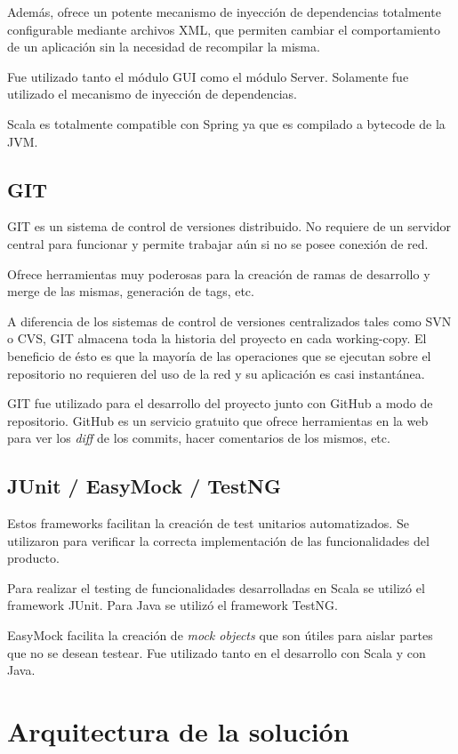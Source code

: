 \documentclass[12pt,a4paper]{article}
\let\stdsection\section
\renewcommand\section{\newpage\stdsection}
\begin{document}
Además, ofrece un potente mecanismo de inyección de dependencias totalmente configurable mediante archivos XML, que
permiten cambiar el comportamiento de un aplicación sin la necesidad de recompilar la misma.

Fue utilizado tanto el módulo GUI como el módulo Server. Solamente fue utilizado el mecanismo de inyección
de dependencias.

Scala es totalmente compatible con Spring ya que es compilado a bytecode de la JVM.

\subsection{GIT}
GIT es un sistema de control de versiones distribuido. No requiere de un servidor central para funcionar y permite
trabajar aún si no se posee conexión de red.

Ofrece herramientas muy poderosas para la creación de ramas de desarrollo y merge de las mismas, generación de tags, etc.

A diferencia de los sistemas de control de versiones centralizados tales como SVN o CVS, GIT almacena toda la historia
del proyecto en cada working-copy. El beneficio de ésto es que la mayoría de las operaciones que se ejecutan sobre
el repositorio no requieren del uso de la red y su aplicación es casi instantánea.

GIT fue utilizado para el desarrollo del proyecto junto con GitHub \cite{github} a modo de repositorio. GitHub es un servicio
gratuito que ofrece herramientas en la web para ver los \textit{diff} de los commits, hacer comentarios de los mismos, etc.

\subsection{JUnit \cite{junit} / EasyMock \cite{easymock} / TestNG \cite{testng} }
Estos frameworks facilitan la creación de test unitarios automatizados. Se utilizaron para verificar la correcta
implementación de las funcionalidades del producto.

Para realizar el testing de funcionalidades desarrolladas en Scala se utilizó el framework JUnit. Para Java se utilizó
el framework TestNG.

EasyMock facilita la creación de \textit{mock objects} \cite{mocks} que son útiles para aislar partes que no se desean
testear. Fue utilizado tanto en el desarrollo con Scala y con Java.

\section{Arquitectura de la solución}
\end{document}
